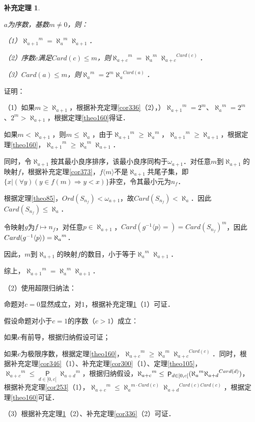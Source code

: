 \documentclass[12pt, a4paper, oneside]{book}
\newtheorem{cor}{补充定理}
\begin{document}
			\begin{cor}\label{cor382}
				\hfill\par
				$a$为序数，基数$m\neq 0$，则：
				\par
				（1）${\aleph_{a+1}}^m={\aleph_a}^m\aleph_{a+1}$．
				\par
				（2）序数$c$满足$Card(c)\leq m$，则${\aleph_{a+c}}^m={\aleph_a}^m{\aleph_{a+c}}^{Card(c)}$．
				\par
				（3）$Card(a)\leq m$，则${\aleph_a}^m=2^m{\aleph_a}^{Card(a)}$．
			\end{cor}
			证明：
			\par
			（1）如果$m\geq \aleph_{a+1}$，根据补充定理\ref{cor336}（2），）${\aleph_{a+1}}^m=2^m$、${\aleph_a}^m=2^m$、$2^m>\aleph_{a+1}$，根据定理\ref{theo160}得证．
			\par
			如果$m<\aleph_{a+1}$，则$m\leq \aleph_a$，由于${\aleph_{a+1}}^m\geq {\aleph_a}^m$，${\aleph_{a+1}}^m\geq \aleph_{a+1}$，根据定理\ref{theo160}，${\aleph_{a+1}}^m\geq {\aleph_a}^m\aleph_{a+1}$．
			\par
			同时，令$\aleph_{a+1}$按其最小良序排序，该最小良序同构于$\omega_{a+1}$．对任意$m$到$\aleph_{a+1}$的映射$f$，根据补充定理\ref{cor373}，$f\langle m\rangle$不是$\aleph_{a+1}$共尾子集，即$\{x|(\forall y)(y\in f(m)\Rightarrow y<x)\}$非空，令其最小元为$n_f$．
			\par
			根据定理\ref{theo85}，$Ord(S_{n_f})< \omega_{a+1}$，故$Card(S_{n_f})<\aleph_a$．因此$Card(S_{n_f})\leq \aleph_a$．
			\par
			令映射$g$为$f\mapsto n_f$，对任意$p\in \aleph_{a+1}$，$Card(g^{-1}\langle p \rangle=			)=Card(S_{n_f})^m$，因此\\$Card(g^{-1}\langle p \rangle)\\={\aleph_a}^m$．
			\par
			因此，$m$到$\aleph_{a+1}$的映射$f$的数目，小于等于${\aleph_a}^m\aleph_{a+1}$．
			\par
			综上，${\aleph_{a+1}}^m={\aleph_a}^m\aleph_{a+1}$．
			\par
			（2）使用超限归纳法：
			\par
			命题对$c=0$显然成立，对$1$，根据补充定理\ref{cor382}（1）可证．
			\par
			假设命题对小于$c=1$的序数（$c>1$）成立：
			\par
			如果$c$有前导，根据归纳假设可证；
			\par
			如果$c$为极限序数，根据定理\ref{theo160}，${\aleph_{a+c}}^m\geq {\aleph_a}^m{\aleph_{a+c}}^{Card(c)}$．同时，根据补充定理\ref{cor346}（1）、补充定理\ref{cor300}（1）、定理\ref{theo105}，${\aleph_{a+c}}^m\leq \mathop{\mathsf{P}}\limits_{d\in [0, c[}{\aleph_{a+d}}^m$，根据归纳假设，${\aleph_{a+c}}^m\leq\\\mathop{\mathsf{P}}_{d\in [0, c[}({\aleph_a}^m{\aleph_{a+d}}^{Card(d)})$，根据补充定理\ref{cor253}（1），${\aleph_{a+c}}^m\leq {\aleph_a}^{m\cdot Card(c)}{\aleph_{a+d}}^{Card(c) Card(c)}$，根据定理\ref{theo160}可证．
			\par
			（3）根据补充定理\ref{cor382}（2）、补充定理\ref{cor336}（2）可证．
			
\end{document}
